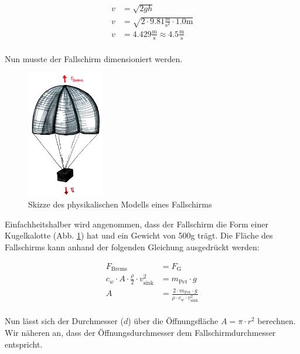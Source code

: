\begin{equation}
\label{eq:pet}
\begin{split}
v &= \sqrt{2gh} \\
v &= \sqrt{2 \cdot 9.81\frac{\text{m}}{\text{s}^2} \cdot 1.0\text{m}} \\
v &= 4.429 \frac{\text{m}}{\text{s}} \approx 4.5 \frac{\text{m}}{\text{s}} \\
\end{split}
\end{equation}

Nun musste der Fallschirm dimensioniert werden.
\begin{figure}[H]
	\centering
	\includegraphics[width=0.3\textwidth] {images/fallschirm_berechnung.png}
	\caption{Skizze des physikalischen Modells eines Fallschirms}
	\label{fig:fallschirm-berechnung}
\end{figure}
Einfachheitshalber wird angenommen, dass der Fallschirm die Form einer Kugelkalotte (Abb. \ref{fig:fallschirm-berechnung}) hat und ein Gewicht von 500g trägt. Die Fläche des Fallschirms kann anhand der folgenden Gleichung ausgedrückt werden:


\begin{equation}
\begin{split}
F_{\text{Brems}} &= F_{\text{G}} \\
c_{w} \cdot A \cdot \frac{\rho}{2} \cdot v_{\text{sink}}^{2} &= m_{\text{Pet}} \cdot g \\
A &= \frac{2 \cdot m_{\text{Pet}} \cdot g}{\rho \cdot c_{w} \cdot v_{\text{sink}}^{2} } \\
\end{split}
\end{equation}

Nun lässt sich der Durchmesser ($d$) über die Öffnungsfläche $A = \pi \cdot r^2$ berechnen. Wir näheren an, dass der Öffnungsdurchmesser dem Fallschirmdurchmesser entspricht.

